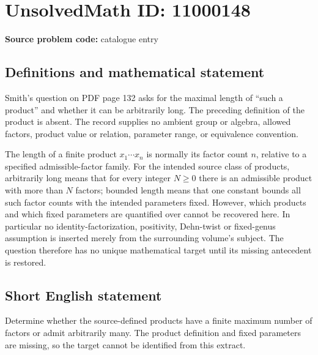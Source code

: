 \documentclass[11pt]{article}
\begin{document}
\section*{UnsolvedMath ID: 11000148}
\textbf{Source problem code:} catalogue entry
\subsection{Definitions and mathematical statement}
Smith's question on PDF page 132 asks for the maximal length of ``such a product'' and whether it can be arbitrarily long. The preceding definition of the product is absent. The record supplies no ambient group or algebra, allowed factors, product value or relation, parameter range, or equivalence convention.

The length of a finite product \(x_1\cdots x_n\) is normally its factor count \(n\), relative to a specified admissible-factor family. For the intended source class of products, arbitrarily long means that for every integer \(N\ge0\) there is an admissible product with more than \(N\) factors; bounded length means that one constant bounds all such factor counts with the intended parameters fixed. However, which products and which fixed parameters are quantified over cannot be recovered here. In particular no identity-factorization, positivity, Dehn-twist or fixed-genus assumption is inserted merely from the surrounding volume's subject. The question therefore has no unique mathematical target until its missing antecedent is restored.
\subsection{Short English statement}
Determine whether the source-defined products have a finite maximum number of factors or admit arbitrarily many. The product definition and fixed parameters are missing, so the target cannot be identified from this extract.
\end{document}
